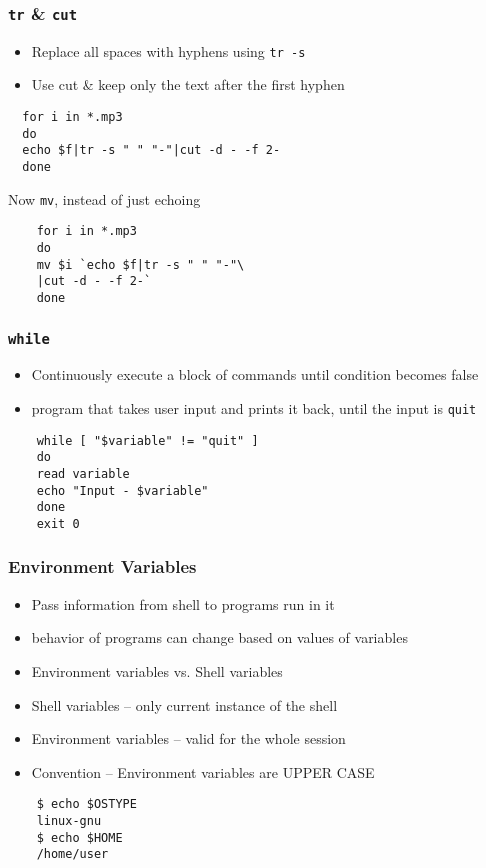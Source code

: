 \documentclass[12pt,compress]{beamer}
\begin{document}
\begin{frame}[fragile]
  \frametitle{\texttt{tr} \& \texttt{cut}}
  \begin{itemize}
  \item Replace all spaces with hyphens using \texttt{tr -s}
  \item Use cut \& keep only the text after the first hyphen
  \end{itemize}
  \begin{lstlisting}
  for i in *.mp3
  do 
  echo $f|tr -s " " "-"|cut -d - -f 2-
  done
  \end{lstlisting} %
  Now \texttt{mv}, instead of just echoing
  \begin{lstlisting}
    for i in *.mp3
    do 
    mv $i `echo $f|tr -s " " "-"\
    |cut -d - -f 2-`
    done
  \end{lstlisting} %
\end{frame}


\begin{frame}[fragile]
  \frametitle{\texttt{while}}
  \begin{itemize}
  \item Continuously execute a block of commands until condition
    becomes false
  \end{itemize}

  \begin{itemize}
  \item program that takes user input and prints it back, until the
    input is \texttt{quit}
  \end{itemize}

  \begin{lstlisting}
    while [ "$variable" != "quit" ]
    do
    read variable
    echo "Input - $variable"
    done
    exit 0
  \end{lstlisting} %
\end{frame}

\begin{frame}[fragile]
  \frametitle{Environment Variables}
  \begin{itemize}
  \item Pass information from shell to programs run in it
  \item behavior of programs can change based on values of variables
  \item Environment variables vs. Shell variables
  \item Shell variables -- only current instance of the shell
  \item Environment variables -- valid for the whole session
  \item Convention -- Environment variables are UPPER CASE
  \end{itemize}
  \begin{lstlisting}
    $ echo $OSTYPE 
    linux-gnu
    $ echo $HOME
    /home/user
  \end{lstlisting} %
\end{frame}
\end{document}
